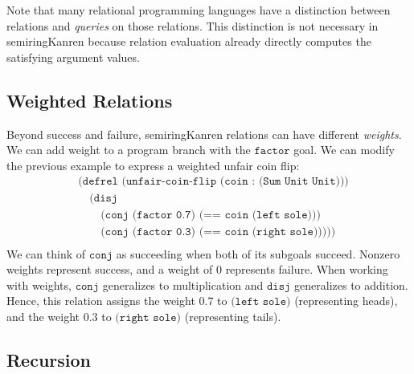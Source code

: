 \documentclass{report}
\theoremstyle{definition}
\begin{document}
Note that many relational programming languages have a distinction between relations and \emph{queries} on those relations.
This distinction is not necessary in semiringKanren because relation evaluation already directly computes the satisfying argument values.

\subsection{Weighted Relations}

Beyond success and failure, semiringKanren relations can have different \emph{weights}.
We can add weight to a program branch with the \(\texttt{factor}\) goal.
We can modify the previous example to express a weighted unfair coin flip:
\begin{equation}
\begin{aligned}
	& \texttt{(defrel (unfair-coin-flip (coin : (Sum Unit Unit)))} \\
	& \quad \texttt{(disj} \\
	& \quad \quad \texttt{(conj (factor 0.7) (== coin (left sole)))} \\
	& \quad \quad \texttt{(conj (factor 0.3) (== coin (right sole)))))} \\
\end{aligned}
\end{equation}
We can think of \(\texttt{conj}\) as succeeding when both of its subgoals succeed.
Nonzero weights represent success, and a weight of \(0\) represents failure.
When working with weights, \(\texttt{conj}\) generalizes to multiplication and \(\texttt{disj}\) generalizes to addition.
Hence, this relation assigns the weight \(0.7\) to \(\texttt{(left sole)}\) (representing heads), and the weight \(0.3\) to \(\texttt{(right sole)}\) (representing tails).

\subsection{Recursion}
\end{document}
